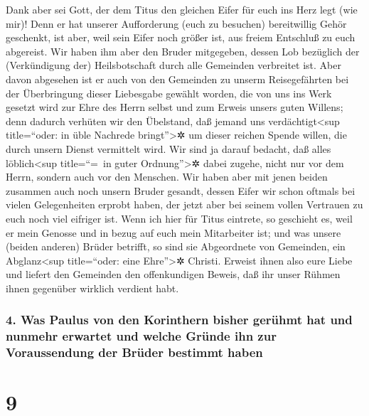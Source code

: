  Dank aber sei Gott, der dem Titus den gleichen Eifer für
euch ins Herz legt (wie mir)!  Denn er hat unserer
Aufforderung (euch zu besuchen) bereitwillig Gehör geschenkt, ist aber,
weil sein Eifer noch größer ist, aus freiem Entschluß zu euch abgereist.
 Wir haben ihm aber den Bruder mitgegeben, dessen Lob
bezüglich der (Verkündigung der) Heilsbotschaft durch alle Gemeinden
verbreitet ist.  Aber davon abgesehen ist er auch von den
Gemeinden zu unserm Reisegefährten bei der Überbringung dieser
Liebesgabe gewählt worden, die von uns ins Werk gesetzt wird zur Ehre
des Herrn selbst und zum Erweis unsers guten Willens; 
denn dadurch verhüten wir den Übelstand, daß jemand uns
verdächtigt\textless sup title=``oder: in üble Nachrede
bringt''\textgreater✲ um dieser reichen Spende willen, die durch unsern
Dienst vermittelt wird.  Wir sind ja darauf bedacht, daß
alles löblich\textless sup title=``=~in guter Ordnung''\textgreater✲
dabei zugehe, nicht nur vor dem Herrn, sondern auch vor den Menschen.
 Wir haben aber mit jenen beiden zusammen auch noch
unsern Bruder gesandt, dessen Eifer wir schon oftmals bei vielen
Gelegenheiten erprobt haben, der jetzt aber bei seinem vollen Vertrauen
zu euch noch viel eifriger ist.  Wenn ich hier für Titus
eintrete, so geschieht es, weil er mein Genosse und in bezug auf euch
mein Mitarbeiter ist; und was unsere (beiden anderen) Brüder betrifft,
so sind sie Abgeordnete von Gemeinden, ein Abglanz\textless sup
title=``oder: eine Ehre''\textgreater✲ Christi.  Erweist
ihnen also eure Liebe und liefert den Gemeinden den offenkundigen
Beweis, daß ihr unser Rühmen ihnen gegenüber wirklich verdient habt.

\hypertarget{was-paulus-von-den-korinthern-bisher-geruxfchmt-hat-und-nunmehr-erwartet-und-welche-gruxfcnde-ihn-zur-voraussendung-der-bruxfcder-bestimmt-haben}{%
\subsubsection{4. Was Paulus von den Korinthern bisher gerühmt hat und
nunmehr erwartet und welche Gründe ihn zur Voraussendung der Brüder
bestimmt
haben}\label{was-paulus-von-den-korinthern-bisher-geruxfchmt-hat-und-nunmehr-erwartet-und-welche-gruxfcnde-ihn-zur-voraussendung-der-bruxfcder-bestimmt-haben}}

\hypertarget{section-8}{%
\section{9}\label{section-8}}

